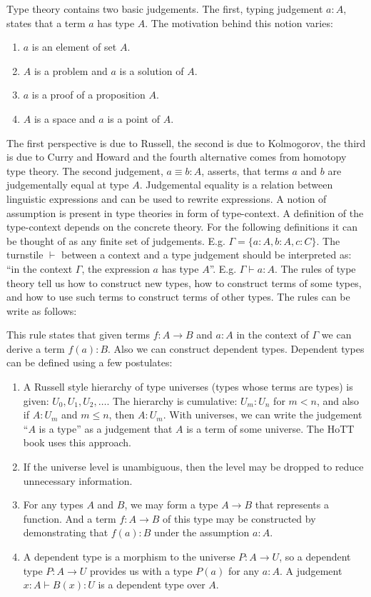 Type theory contains two basic judgements. The first, typing judgement $a : A$, states that a term $a$ has type $A$. The motivation behind this notion varies:
\begin{enumerate}
	\item $a$ is an element of set $A$.
	\item $A$ is a problem and $a$ is a solution of $A$.
	\item $a$ is a proof of a proposition $A$.
	\item $A$ is a space and $a$ is a point of $A$.
\end{enumerate}
The first perspective is due to Russell, the second is due to Kolmogorov, the third is due to Curry and Howard and the fourth alternative comes from homotopy type theory\autocite{Warren1}. 
The second judgement, $a \equiv b : A$, asserts, that terms $a$ and $b$ are judgementally equal at type $A$. Judgemental equality is a relation between linguistic expressions and can be used to rewrite expressions\autocite{hottbook}. A notion of assumption is present in type theories in form of type-context.
A definition of the type-context depends on the concrete theory. For the following definitions it can be thought of as any finite set of judgements. E.g. $\Gamma = \{a : A, b : A, c : C\}$. The turnstile $\vdash$ between a context and a type judgement should be interpreted as: ``in the context $\Gamma$, the expression $a$ has type $A$''. E.g. $\Gamma \vdash a : A$. The rules of type theory tell us how to construct new types, how to construct terms of some types, and how to use such terms to construct terms of other types. The rules can be write as follows:
\begin{prooftree}
\end{prooftree}
This rule states that given terms $f : A \to B$ and $a : A$ in the context of $\Gamma$ we can derive a term $f(a) : B$.
Also we can construct dependent types. Dependent types can be defined using a few postulates\autocite{Wellen1}:
\begin{enumerate}
  \item A Russell style hierarchy of type universes (types whose terms are types) is given: $U_0, U_1, U_2, \dots$. The hierarchy is cumulative: $U_m : U_n$ for $m < n$, and also if $A : U_m$ and $m \leq n$, then $A : U_m$. With universes, we can write the judgement ``$A$ is a type'' as a judgement that $A$ is a term of some universe. The HoTT book uses this approach.  
  \item If the universe level is unambiguous, then the level may be dropped to reduce unnecessary information.
  \item For any types $A$ and $B$, we may form a type $A \to B$ that represents a function. And a term $f : A \to B$ of this type may be constructed by demonstrating that $f(a) : B$ under the assumption $a : A$.
  \item A dependent type is a morphism to the universe $P : A \to U$, so a dependent type $P : A \to U$ provides us with a type $P(a)$ for any $a : A$. A judgement $x : A \vdash B(x) : U$ is a dependent type over $A$.
\end{enumerate}



